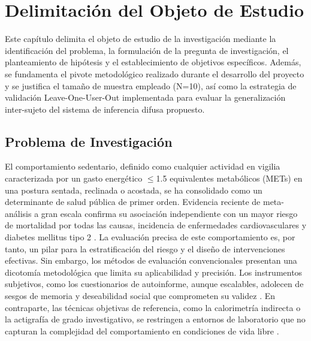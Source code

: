 ﻿\chapter{Delimitación del Objeto de Estudio}
\label{chap:delimitacion}

\noindent Este capítulo delimita el objeto de estudio de la investigación mediante la identificación del problema, la formulación de la pregunta de investigación, el planteamiento de hipótesis y el establecimiento de objetivos específicos. Además, se fundamenta el pivote metodológico realizado durante el desarrollo del proyecto y se justifica el tamaño de muestra empleado (N=10), así como la estrategia de validación Leave-One-User-Out implementada para evaluar la generalización inter-sujeto del sistema de inferencia difusa propuesto.

\section{Problema de Investigación}
\label{sec:problema_investigacion}

El comportamiento sedentario, definido como cualquier actividad en vigilia caracterizada por un gasto energético $\leq$1.5 equivalentes metabólicos (METs) en una postura sentada, reclinada o acostada, se ha consolidado como un determinante de salud pública de primer orden. Evidencia reciente de meta-análisis a gran escala confirma su asociación independiente con un mayor riesgo de mortalidad por todas las causas, incidencia de enfermedades cardiovasculares y diabetes mellitus tipo 2 \citep{Katzmarzyk2023Impact,Santos2023CostInaction}. La evaluación precisa de este comportamiento es, por tanto, un pilar para la estratificación del riesgo y el diseño de intervenciones efectivas. Sin embargo, los métodos de evaluación convencionales presentan una dicotomía metodológica que limita su aplicabilidad y precisión. Los instrumentos subjetivos, como los cuestionarios de autoinforme, aunque escalables, adolecen de sesgos de memoria y deseabilidad social que comprometen su validez \citep{Healy2024,Prince2008}. En contraparte, las técnicas objetivas de referencia, como la calorimetría indirecta o la actigrafía de grado investigativo, se restringen a entornos de laboratorio que no capturan la complejidad del comportamiento en condiciones de vida libre \citep{Migueles2022GRANADA}.

